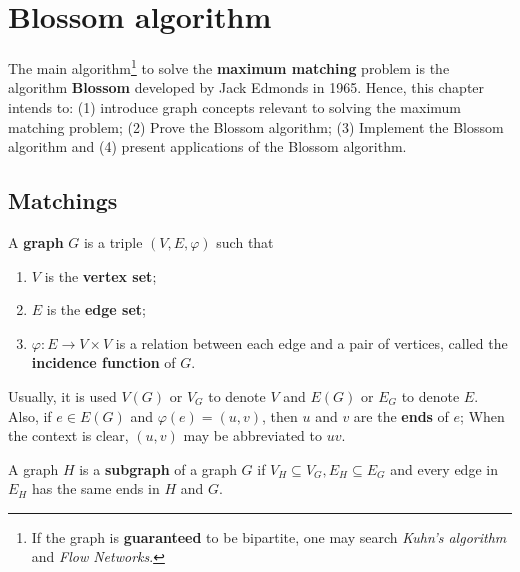 \renewcommand*{\proofname}{Proof}

\chapter{Blossom algorithm}

The main algorithm\footnote{If the graph is \textbf{guaranteed} to be bipartite, one may search \textit{Kuhn's algorithm} and \textit{Flow Networks}.} to solve the \textbf{maximum matching} problem is the algorithm \textbf{Blossom} developed by Jack Edmonds in 1965.
Hence, this chapter intends to: 
(1) introduce graph concepts relevant to solving the maximum matching problem;
(2) Prove the Blossom algorithm; 
(3) Implement the Blossom algorithm and 
(4) present applications of the Blossom algorithm.

\enlargethispage{.5\baselineskip}

\section{Matchings}

\begin{definition}[Graph]
	\label{def:graph}
	A \textbf{graph} \(G\) is a triple \((V, E, \varphi)\) such that
	\begin{enumerate}[label=(\roman*)]
		\item \(V\) is the \textbf{vertex set};
		\item \(E\) is the \textbf{edge set};
		\item \(\varphi: E \to V \times V\) is a relation between each edge and a pair of vertices, called the \textbf{incidence function} of \(G\).
	\end{enumerate}
	Usually, it is used 
	\(V(G)\) or \(V_G\) to denote \(V\) and 
	\(E(G)\) or \(E_G\) to denote \(E\).
	Also, if \(e \in E(G)\) and \(\varphi(e) = (u, v)\), then \(u\) and \(v\) are the \textbf{ends} of \(e\);
	When the context is clear, \((u, v)\) may be abbreviated to \(uv\).
\end{definition}

\begin{definition}[Subgraph]
	\label{def:subgraph}
	A graph \(H\) is a \textbf{subgraph} of a graph \(G\) if 
	\(V_H \subseteq V_G, E_H \subseteq E_G\) and every edge in \(E_H\) has the same ends in \(H\) and \(G\).
\end{definition}

